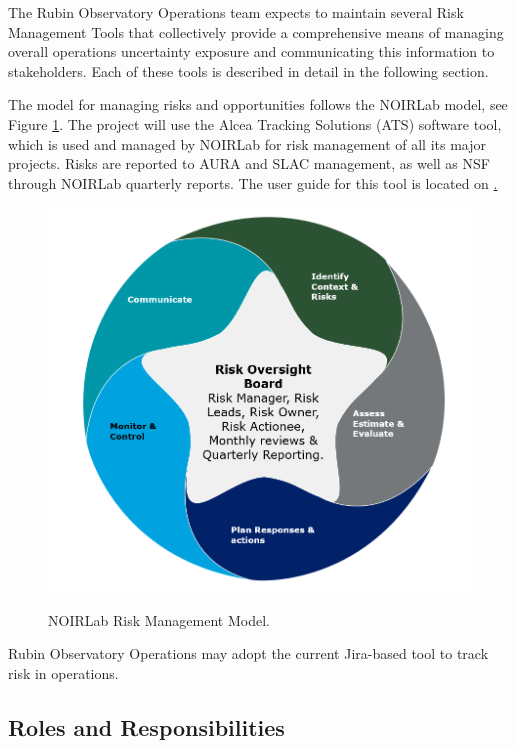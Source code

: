 The Rubin Observatory Operations team expects to maintain several Risk Management Tools that collectively provide a comprehensive means of managing overall operations uncertainty exposure and communicating this information to stakeholders.
Each of these tools is described in detail in the following section.

The model for managing risks and opportunities follows the NOIRLab model, see Figure \ref{fig:NOIRLab-risk-model}.
The project will use the Alcea Tracking Solutions (ATS) software tool, which is used and managed by NOIRLab for risk management of all its major projects.
Risks are reported to AURA and SLAC management, as well as NSF through NOIRLab quarterly reports.
The user guide for this tool is located on \href{RTN-051.lsst.io}.

\begin{figure}[t]
\caption{NOIRLab Risk Management Model.}
\centering
\includegraphics[width=\textwidth]{NOIRLab-risk-model-temp}
\label{fig:NOIRLab-risk-model}
\end{figure}

Rubin Observatory Operations may adopt the current Jira-based tool to track risk in operations.

\subsection{Roles and Responsibilities}

